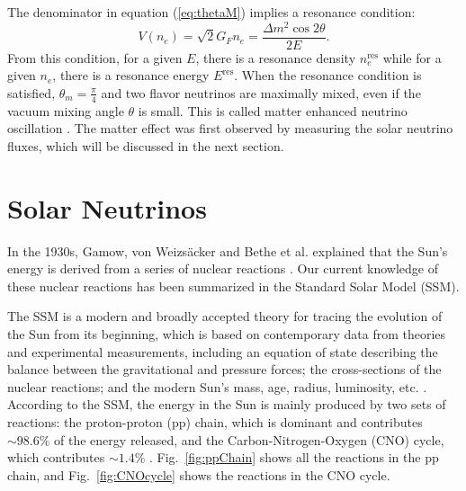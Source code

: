 The denominator in equation (\ref{eq:thetaM}) implies a resonance condition:
\begin{equation}\label{eq:reson_condition}
	V(n_e)=\sqrt 2G_Fn_e=\frac{\Delta m^2\cos2\theta}{2E}.
\end{equation}
From this condition, for a given $E$, there is a resonance density $n^{\mathrm{res}}_e$ while for a given $n_e$, there is a resonance energy $E^{\mathrm{res}}$. When the resonance condition is satisfied, $\theta_m = \frac{\pi}{4}$ and two flavor neutrinos are maximally mixed, even if the vacuum mixing angle $\theta$ is small. This is called matter enhanced neutrino oscillation \cite{smirnov2016solar,fukugita2013physics}. The matter effect was first observed by measuring the solar neutrino fluxes, which will be discussed in the next section.

\section{Solar Neutrinos}\label{sect:solarNu}

In the 1930s, Gamow, von Weizs{\"a}cker and Bethe et al. explained that the Sun's energy is derived from a series of nuclear reactions \cite{bethe1939energy}. Our current knowledge of these nuclear reactions has been summarized in the Standard Solar Model (SSM). 

The SSM is a modern and broadly accepted theory for tracing the evolution of the Sun from its beginning, which is based on contemporary data from theories and experimental measurements, including an equation of state describing the balance between the gravitational and pressure forces; the cross-sections of the nuclear reactions; and the modern Sun's mass, age, radius, luminosity, etc. \cite{haxton2013solar}. According to the SSM, the energy in the Sun is mainly produced by two sets of reactions: the proton-proton (pp) chain, which is dominant and contributes $\sim 98.6\%$ of the energy released, and the Carbon-Nitrogen-Oxygen (CNO) cycle, which contributes $\sim 1.4\%$ \cite{antonio2018state}. Fig.~\ref{fig:ppChain} shows all the reactions in the pp chain, and Fig.~\ref{fig:CNOcycle} shows the reactions in the CNO cycle. 

